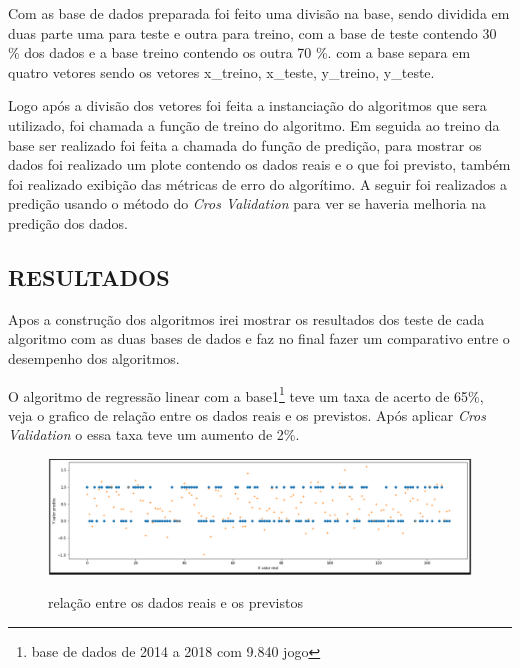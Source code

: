 Com as base de dados preparada foi feito uma divisão na base, sendo dividida em duas parte uma para teste e outra para treino, com a base de teste contendo 30 \% dos dados e a base treino contendo os outra 70 \%. com a base separa em quatro vetores sendo os vetores x\_treino, x\_teste, y\_treino, y\_teste.

Logo após a divisão dos vetores foi feita a instanciação do algoritmos que sera utilizado, foi chamada a função de treino do algoritmo. Em seguida ao treino da base ser realizado foi feita a chamada do função de predição, para mostrar os dados foi realizado um plote contendo os dados reais e o que foi previsto, também foi realizado exibição das métricas de erro do algorítimo. A seguir foi realizados a predição usando o método do \textit{Cros Validation} para ver se haveria melhoria na predição dos dados.

\subsection{RESULTADOS} 

Apos a construção dos algoritmos irei mostrar os resultados dos teste de cada algoritmo com as duas bases de dados e faz no final fazer um comparativo entre o desempenho dos algoritmos.

O algoritmo de regressão linear com a base1\footnote[4]{base de dados de 2014 a 2018 com 9.840 jogo} teve um taxa de acerto de 65\%, veja o grafico de relação entre os dados reais e os previstos. Após aplicar \textit{Cros Validation} o essa taxa teve um aumento de 2\%.
\begin{figure}[htbp]
	\begin{center}
		\includegraphics[width=0.7\linewidth]{imagens/regressailinear.png}\\
	\end{center}
	\caption[relação entre os dados reais e os previstos]{relação entre os dados reais e os previstos}
	\label{fig:logo}
\end{figure}

